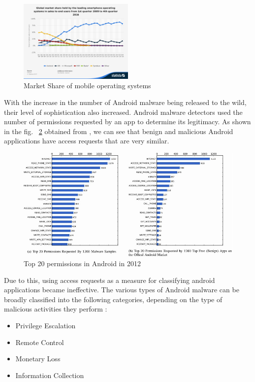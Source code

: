 	\begin{figure}[osMarketShare]
		\centering
		\includegraphics[width=0.5\textwidth]{OS_Market_Share.png}
		\caption{Market Share of mobile operating systems}
		\label{osMarketShare}
	\end{figure}

	With the increase in the number of Android malware being released to the wild, their level of sophistication also increased. Android malware detectors used the number of permissions requested by an app to determine its legitimacy. As shown in the fig. ~\ref{permissionsAndroid} obtained from \cite{zhou}, we can see that benign and malicious Android applications have access requests that are very similar. 	
	
	\begin{figure}[permissionsAndroid]
			\centering
			\includegraphics[width=200mm]{permissionsList.jpg}
			\caption{Top 20 permissions in Android in 2012}
			\label{permissionsAndroid}
	\end{figure}
		
	Due to this, using access requests as a measure for classifying android applications became ineffective. The various types of Android malware can be broadly classified into the following categories, depending on the type of malicious activities they perform \cite{zhou}:
	
	\begin{itemize}
		\item Privilege Escalation
		\item Remote Control
		\item Monetary Loss
		\item Information Collection
	\end{itemize}
	

